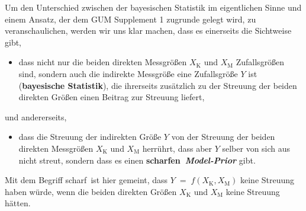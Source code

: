 Um den Unterschied zwischen der bayesischen Statistik im eigentlichen Sinne
und einem Ansatz, der dem GUM Supplement 1 \cite{GUMS1} zugrunde gelegt wird, zu veranschaulichen,
werden wir uns klar machen, dass es einerseits die Sichtweise gibt,
\begin{itemize}
\item dass nicht nur die beiden direkten Messgrößen $X_\mathrm{K}$ und $X_\mathrm{M}$
Zufallsgrößen sind, sondern auch die indirekte Messgröße eine Zufallsgröße $Y$ ist
(\textbf{bayesische Statistik}),
die ihrerseits zusätzlich zu der Streuung der beiden direkten Größen einen Beitrag zur
Streuung liefert,
\end{itemize}
und andererseits,
\begin{itemize}
\item dass die Streuung der indirekten Größe $Y$ von der Streuung der beiden
direkten Messgrößen $X_\mathrm{K}$ und $X_\mathrm{M}$ herrührt, dass aber $Y$ selber von sich
aus nicht streut, sondern dass es
einen \textbf{\glqq scharfen\grqq ~\textsl{Model-Prior}} gibt.
\end{itemize}
Mit dem Begriff \glqq scharf\grqq ~ist hier gemeint, dass $Y \; = \; f(X_\mathrm{K}, X_\mathrm{M})$ keine Streuung haben würde, wenn die beiden direkten Größen
$X_\mathrm{K}$ und $X_\mathrm{M}$ keine Streuung hätten.

